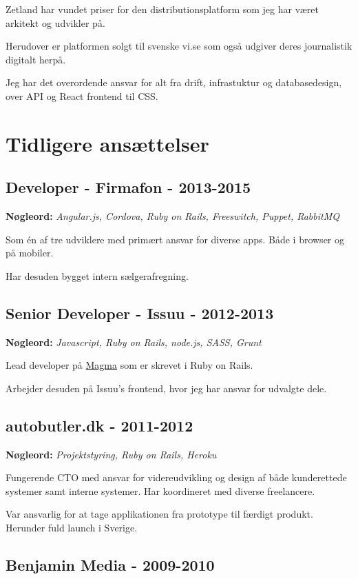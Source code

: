 \documentclass[a4paper]{article}
\newcommand{\keywords}[1]{\small\textbf{Nøgleord:} \emph{#1}\normalsize}
\begin{document}
Zetland har vundet priser for den distributionsplatform som jeg har været arkitekt og udvikler på.

Herudover er platformen solgt til svenske vi.se som også udgiver deres journalistik digitalt herpå.

Jeg har det overordende ansvar for alt fra drift, infrastuktur og databasedesign, over API og React frontend til CSS.

\section*{Tidligere ansættelser}

\subsection*{Developer - Firmafon - 2013-2015}
\keywords{Angular.js, Cordova, Ruby on Rails, Freeswitch, Puppet, RabbitMQ}

Som én af tre udviklere med primært ansvar for diverse apps. Både i browser og på mobiler.

Har desuden bygget intern sælgerafregning.

\subsection*{Senior Developer - Issuu - 2012-2013}
\keywords{Javascript, Ruby on Rails, node.js, SASS, Grunt}

Lead developer på \href{http://www.magmahq.com}{Magma} som er skrevet i Ruby on Rails.

Arbejder desuden på Issuu's frontend, hvor jeg har ansvar for udvalgte dele.

\subsection*{autobutler.dk - 2011-2012}
\keywords{Projektstyring, Ruby on Rails, Heroku}

Fungerende CTO med ansvar for videreudvikling og design af både kunderettede systemer samt interne systemer. Har koordineret med diverse freelancere.

Var ansvarlig for at tage applikationen fra prototype til færdigt produkt. Herunder fuld launch i Sverige. 

\subsection*{Benjamin Media - 2009-2010}
\end{document}
